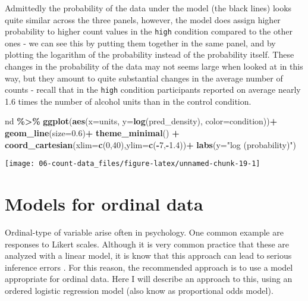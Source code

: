 \documentclass[
]{book}
\newenvironment{Shaded}{\begin{snugshade}}{\end{snugshade}}
\newcommand{\AttributeTok}[1]{\textcolor[rgb]{0.13,0.29,0.53}{#1}}
\newcommand{\DecValTok}[1]{\textcolor[rgb]{0.00,0.00,0.81}{#1}}
\newcommand{\FloatTok}[1]{\textcolor[rgb]{0.00,0.00,0.81}{#1}}
\newcommand{\FunctionTok}[1]{\textcolor[rgb]{0.13,0.29,0.53}{\textbf{#1}}}
\newcommand{\NormalTok}[1]{#1}
\newcommand{\SpecialCharTok}[1]{\textcolor[rgb]{0.81,0.36,0.00}{\textbf{#1}}}
\newcommand{\StringTok}[1]{\textcolor[rgb]{0.31,0.60,0.02}{#1}}
\begin{document}
Admittedly the probability of the data under the model (the black lines) looks quite similar across the three panels, however, the model does assign higher probability to higher count values in the \texttt{high} condition compared to the other ones - we can see this by putting them together in the same panel, and by plotting the logarithm of the probability instead of the probability itself. These changes in the probability of the data may not seems large when looked at in this way, but they amount to quite substantial changes in the average number of counts - recall that in the \texttt{high} condition participants reported on average nearly 1.6 times the number of alcohol units than in the control condition.

\begin{Shaded}
\begin{Highlighting}[]
\NormalTok{nd }\SpecialCharTok{\%\textgreater{}\%}
  \FunctionTok{ggplot}\NormalTok{(}\FunctionTok{aes}\NormalTok{(}\AttributeTok{x=}\NormalTok{units, }\AttributeTok{y=}\FunctionTok{log}\NormalTok{(pred\_density), }\AttributeTok{color=}\NormalTok{condition))}\SpecialCharTok{+}
  \FunctionTok{geom\_line}\NormalTok{(}\AttributeTok{size=}\FloatTok{0.6}\NormalTok{)}\SpecialCharTok{+}
  \FunctionTok{theme\_minimal}\NormalTok{() }\SpecialCharTok{+}
  \FunctionTok{coord\_cartesian}\NormalTok{(}\AttributeTok{xlim=}\FunctionTok{c}\NormalTok{(}\DecValTok{0}\NormalTok{,}\DecValTok{40}\NormalTok{),}\AttributeTok{ylim=}\FunctionTok{c}\NormalTok{(}\SpecialCharTok{{-}}\DecValTok{7}\NormalTok{,}\SpecialCharTok{{-}}\FloatTok{1.4}\NormalTok{))}\SpecialCharTok{+}
  \FunctionTok{labs}\NormalTok{(}\AttributeTok{y=}\StringTok{"log (probability)"}\NormalTok{)}
\end{Highlighting}
\end{Shaded}

\begin{center}\texttt{[image: 06-count-data\_files/figure-latex/unnamed-chunk-19-1]} \end{center}

\chapter{Models for ordinal data}\label{ordinal}

Ordinal-type of variable arise often in psychology. One common example are responses to Likert scales. Although it is very common practice that these are analyzed with a linear model, it is know that this approach can lead to serious inference errors \citep{Liddell2018}. For this reason, the recommended approach is to use a model appropriate for ordinal data. Here I will describe an approach to this, using an ordered logistic regression model (also know as proportional odds model).
\end{document}
